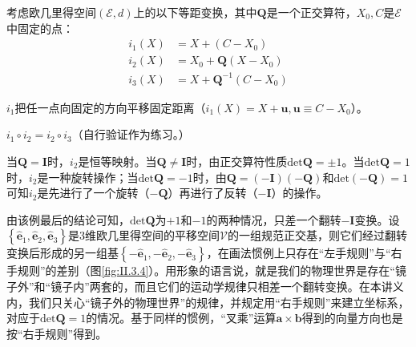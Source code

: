 \documentclass[../main.tex]{subfiles}
\begin{document}
\begin{example}\label{exp:II.3.4}
    考虑欧几里得空间$\left(\mathcal{E},d\right)$上的以下等距变换，其中$\mathbf{Q}$是一个正交算符，$X_0,C$是$\mathcal{E}$中固定的点：
    \begin{align*}
        i_1\left(X\right) & =X+\left(C-X_0\right)                \\
        i_2\left(X\right) & =X_0+\mathbf{Q}\left(X-X_0\right)    \\
        i_3\left(X\right) & =X+\mathbf{Q}^{-1}\left(C-X_0\right)
    \end{align*}

    $i_1$把任一点向固定的方向平移固定距离（$i_1\left(X\right)=X+\mathbf{u},\mathbf{u}\equiv C-X_0$）。

    $i_1\circ i_2=i_2\circ i_3$（自行验证作为练习。）

    当$\mathbf{Q}=\mathbf{I}$时，$i_2$是恒等映射。当$\mathbf{Q}\neq\mathbf{I}$时，由正交算符性质$\mathrm{det}\mathbf{Q}=\pm 1$。当$\mathrm{det}\mathbf{Q}=1$时，$i_2$是一种旋转操作；当$\mathrm{det}\mathbf{Q}=-1$时，由$\mathbf{Q}=\left(-\mathbf{I}\right)\left(-\mathbf{Q}\right)$和$\mathrm{det}\left(-\mathbf{Q}\right)=1$可知$i_2$是先进行了一个旋转（$-\mathbf{Q}$）再进行了反转（$-\mathbf{I}$）的操作。
\end{example}

由该例最后的结论可知，$\mathrm{det}\mathbf{Q}$为$+1$和$-1$的两种情况，只差一个翻转$-\mathbf{I}$变换。设$\left\{\mathbf{\hat{e}}_1,\mathbf{\hat{e}}_2,\mathbf{\hat{e}}_3\right\}$是3维欧几里得空间的平移空间$\mathcal{V}$的一组规范正交基，则它们经过翻转变换后形成的另一组基$\left\{-\mathbf{\hat{e}}_1,-\mathbf{\hat{e}}_2,-\mathbf{\hat{e}}_3\right\}$，在画法惯例上只存在“左手规则”与“右手规则”的差别（图\ref{fig:II.3.4}）。用形象的语言说，就是我们的物理世界是存在“镜子外”和“镜子内”两套的，而且它们的运动学规律只相差一个翻转变换。在本讲义内，我们只关心“镜子外的物理世界”的规律，并规定用“右手规则”来建立坐标系，对应于$\mathrm{det}\mathbf{Q}=1$的情况。基于同样的惯例，“叉乘”运算$\mathbf{a}\times\mathbf{b}$得到的向量方向也是按“右手规则”得到。
\end{document}
